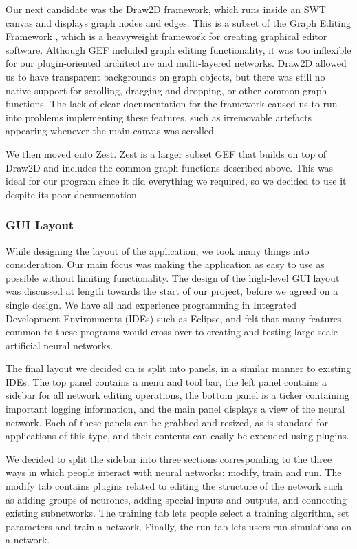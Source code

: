 \documentclass{acm_proc_article-sp}
\begin{document}
{Our next candidate was the Draw2D framework\cite{lib:draw2d}, which runs inside an SWT canvas and displays graph nodes and edges. This is a subset of the Graph Editing Framework \cite{lib:gef}, which is a heavyweight framework for creating graphical editor software. Although GEF included graph editing functionality, it was too inflexible for our plugin-oriented architecture and multi-layered networks. Draw2D allowed us to have transparent backgrounds on graph objects, but there was still no native support for scrolling, dragging and dropping, or other common graph functions. The lack of clear documentation for the framework caused us to run into problems implementing these features, such as irremovable artefacts appearing whenever the main canvas was scrolled.

We then moved onto Zest\cite{lib:zest}. Zest is a larger subset GEF that builds on top of Draw2D and includes the common graph functions described above. This was ideal for our program since it did everything we required, so we decided to use it despite its poor documentation.
}
\subsubsection{GUI Layout}
{
While designing the layout of the application, we took many things into consideration. Our main focus was making the application as easy to use as possible without limiting functionality. The design of the high-level GUI layout was discussed at length towards the start of our project, before we agreed on a single design. We have all had experience programming in Integrated Development Environments (IDEs) such as Eclipse, and felt that many features common to these programs would cross over to creating and testing large-scale artificial neural networks.

The final layout we decided on is split into panels, in a similar manner to existing IDEs. The top panel contains a menu and tool bar, the left panel contains a sidebar for all network editing operations, the bottom panel is a ticker containing important logging information, and the main panel displays a view of the neural network. Each of these panels can be grabbed and resized, as is standard for applications of this type, and their contents can easily be extended using plugins.

We decided to split the sidebar into three sections corresponding to the three ways in which people interact with neural networks: modify, train and run. The modify tab contains plugins related to editing the structure of the network such as adding groups of neurones, adding special inputs and outputs, and connecting existing subnetworks. The training tab lets people select a training algorithm, set parameters and train a network. Finally, the run tab lets users run simulations on a network.
}
\end{document}
